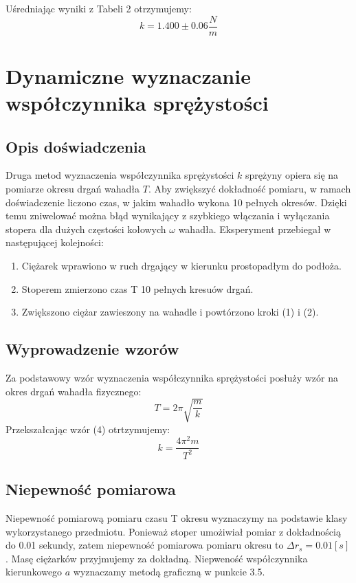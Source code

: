 \documentclass{article} %
\begin{document}
Uśredniając wyniki z Tabeli 2 otrzymujemy:
{\large
\begin{equation}
    k = 1.400 \pm0.06 \frac{N}{m}
\end{equation}
}

\section{Dynamiczne wyznaczanie współczynnika sprężystości}
\subsection{Opis doświadczenia}
Druga metod wyznaczenia współczynnika sprężystości $k$ sprężyny opiera się na pomiarze okresu drgań wahadła $T$. Aby zwiększyć dokładność pomiaru, w ramach doświadczenie liczono czas, w jakim wahadło wykona 10 pełnych okresów. Dzięki temu zniwelować można błąd wynikający z szybkiego włączania i wyłączania stopera dla dużych częstości kołowych $\omega$ wahadła. Eksperyment przebiegał w następującej kolejności:
\begin{enumerate}
    \item Ciężarek wprawiono w ruch drgający w kierunku prostopadłym do podłoża.
    \item Stoperem zmierzono czas T 10 pełnych kresuów drgań.
    \item Zwiększono ciężar zawieszony na wahadle i powtórzono kroki (1) i (2).
\end{enumerate}
\subsection{Wyprowadzenie wzorów}

Za podstawowy wzór wyznaczenia współczynnika sprężystości posłuży wzór na okres drgań wahadła fizycznego:
{\large
\begin{equation}
    T = 2\pi\sqrt{\frac{m}{k}}
\end{equation}
}
Przekszałcając wzór (4) otrtzymujemy:
{\large
\begin{equation}
    k = \frac{4\pi^2m}{T^2}
\end{equation}
}
\subsection{Niepewność pomiarowa}
Niepewność pomiarową pomiaru czasu T okresu wyznaczymy na podstawie klasy wykorzystanego przedmiotu. Ponieważ stoper umożiwiał pomiar z dokładnością do 0.01 sekundy, zatem niepewność pomiarowa pomiaru okresu to $\Delta r_s = 0.01 [s]$. Masę ciężarków przyjmujemy za dokładną. Niepweność współczynnika kierunkowego $a$ wyznaczamy metodą graficzną w punkcie 3.5. 
\end{document}

